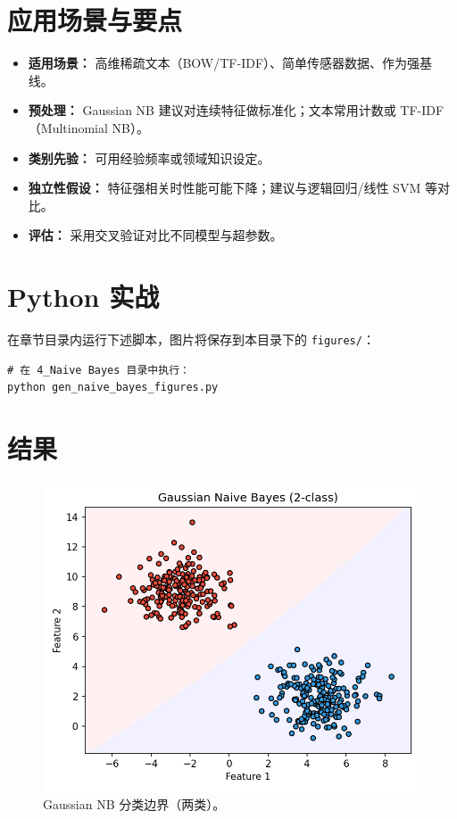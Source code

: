 \documentclass[UTF8,zihao=-4]{ctexart}
\begin{document}
\section{应用场景与要点}
\begin{itemize}
  \item \textbf{适用场景：} 高维稀疏文本（BOW/TF-IDF）、简单传感器数据、作为强基线。
  \item \textbf{预处理：} Gaussian NB 建议对连续特征做标准化；文本常用计数或 TF-IDF（Multinomial NB）。
  \item \textbf{类别先验：} 可用经验频率或领域知识设定。
  \item \textbf{独立性假设：} 特征强相关时性能可能下降；建议与逻辑回归/线性 SVM 等对比。
  \item \textbf{评估：} 采用交叉验证对比不同模型与超参数。
\end{itemize}

\section{Python 实战}
在章节目录内运行下述脚本，图片将保存到本目录下的 \texttt{figures/}：
\begin{lstlisting}[style=code,caption={生成朴素贝叶斯配图},label={lst:genfigs_cn}]
# 在 4_Naive Bayes 目录中执行：
python gen_naive_bayes_figures.py
\end{lstlisting}

\section{结果}
\begin{figure}[H]
  \centering
  \includegraphics[width=0.9\linewidth]{gnb_decision_boundary_2class.png}
  \caption{Gaussian NB 分类边界（两类）。}
  \label{fig:gnb2_cn}
\end{figure}
\FloatBarrier
\end{document}
